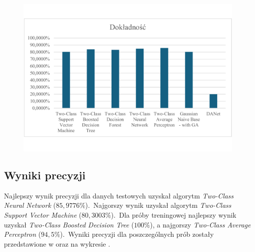 \begin{figure}[H]
    \centering
    \includegraphics[width=\textwidth]{images/acc-res}
    \label{fig:acc-res}
\end{figure}

\subsection{Wyniki precyzji}
Najlepszy wynik precyzji dla danych testowych uzyskał algorytm \textit{Two-Class Neural Network} ($85,9776\%$).\ Najgorszy wynik uzyskał algorytm \textit{Two-Class Support Vector Machine} ($80,3003\%$).\ Dla próby treningowej najlepszy wynik uzyskał \textit{Two-Class Boosted Decision Tree} ($100\%$), a najgorszy \textit{Two-Class Average Perceptron} ($94,5\%$).\ Wyniki precyzji dla poszczególnych prób zostały przedstawione w  oraz na wykresie .


